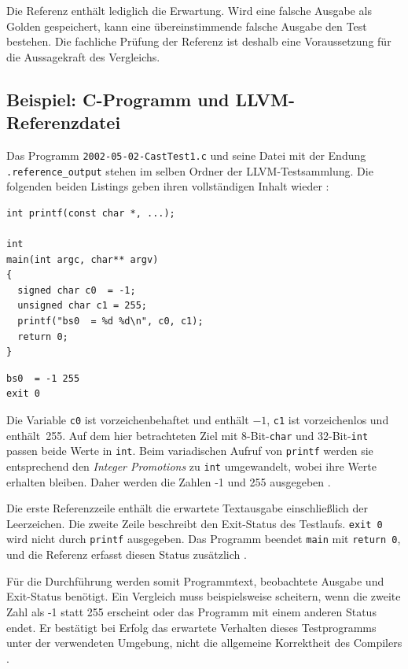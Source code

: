 \documentclass[11pt,a4paper]{article}
\newcommand{\code}[1]{\texttt{#1}}
\begin{document}
Die Referenz enthält lediglich die Erwartung. Wird eine falsche Ausgabe als Golden gespeichert, kann eine übereinstimmende falsche Ausgabe den Test bestehen. Die fachliche Prüfung der Referenz ist deshalb eine Voraussetzung für die Aussagekraft des Vergleichs.

\subsection{Beispiel: C-Programm und LLVM-Referenzdatei}
Das Programm \code{2002-05-02-CastTest1.c} und seine Datei mit der Endung \code{.reference\_output} stehen im selben Ordner der LLVM-Testsammlung. Die folgenden beiden Listings geben ihren vollständigen Inhalt wieder \cite{goldenc}:

\begingroup
\lstset{captionpos=b}
\noindent\begin{minipage}[b]{0.62\textwidth}
\begin{lstlisting}[caption={C-Originalprogramm aus LLVM}]
int printf(const char *, ...);

int
main(int argc, char** argv)
{
  signed char c0  = -1;
  unsigned char c1 = 255;
  printf("bs0  = %d %d\n", c0, c1);
  return 0;
}
\end{lstlisting}
\end{minipage}\hfill
\begin{minipage}[b]{0.32\textwidth}
\begin{lstlisting}[caption={Referenzdatei}]
bs0  = -1 255
exit 0
\end{lstlisting}
\end{minipage}
\endgroup

Die Variable \code{c0} ist vorzeichenbehaftet und enthält $-1$, \code{c1} ist vorzeichenlos und enthält~255. Auf dem hier betrachteten Ziel mit 8-Bit-\code{char} und 32-Bit-\code{int} passen beide Werte in \code{int}. Beim variadischen Aufruf von \code{printf} werden sie entsprechend den \emph{Integer Promotions} zu \code{int} umgewandelt, wobei ihre Werte erhalten bleiben. Daher werden die Zahlen -1 und 255 ausgegeben \cite{cstandard}.

Die erste Referenzzeile enthält die erwartete Textausgabe einschließlich der Leerzeichen. Die zweite Zeile beschreibt den Exit-Status des Testlaufs. \code{exit 0} wird nicht durch \code{printf} ausgegeben. Das Programm beendet \code{main} mit \code{return 0}, und die Referenz erfasst diesen Status zusätzlich \cite{goldenc}.

Für die Durchführung werden somit Programmtext, beobachtete Ausgabe und Exit-Status benötigt. Ein Vergleich muss beispielsweise scheitern, wenn die zweite Zahl als -1 statt 255 erscheint oder das Programm mit einem anderen Status endet. Er bestätigt bei Erfolg das erwartete Verhalten dieses Testprogramms unter der verwendeten Umgebung, nicht die allgemeine Korrektheit des Compilers \cite{goldenc,suiteguide}.
\end{document}

